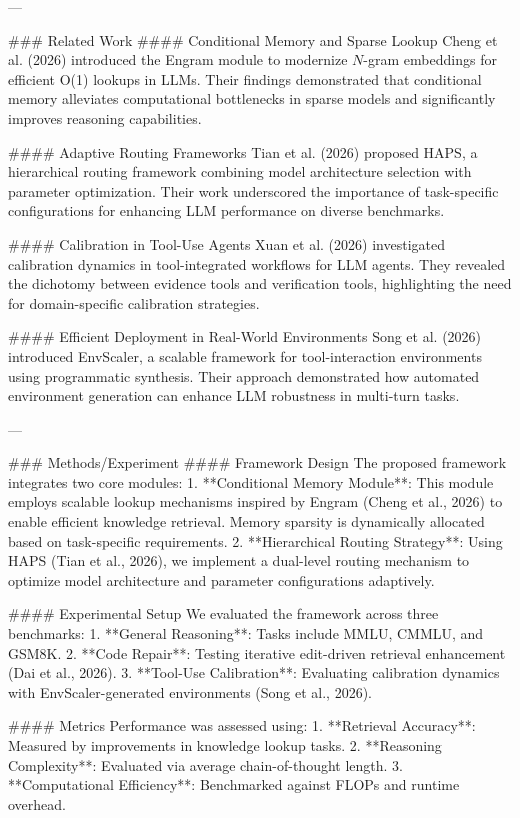---

### Related Work  
#### Conditional Memory and Sparse Lookup  
Cheng et al. (2026) introduced the Engram module to modernize $N$-gram embeddings for efficient O(1) lookups in LLMs. Their findings demonstrated that conditional memory alleviates computational bottlenecks in sparse models and significantly improves reasoning capabilities.

#### Adaptive Routing Frameworks  
Tian et al. (2026) proposed HAPS, a hierarchical routing framework combining model architecture selection with parameter optimization. Their work underscored the importance of task-specific configurations for enhancing LLM performance on diverse benchmarks.

#### Calibration in Tool-Use Agents  
Xuan et al. (2026) investigated calibration dynamics in tool-integrated workflows for LLM agents. They revealed the dichotomy between evidence tools and verification tools, highlighting the need for domain-specific calibration strategies.

#### Efficient Deployment in Real-World Environments  
Song et al. (2026) introduced EnvScaler, a scalable framework for tool-interaction environments using programmatic synthesis. Their approach demonstrated how automated environment generation can enhance LLM robustness in multi-turn tasks.

---

### Methods/Experiment  
#### Framework Design  
The proposed framework integrates two core modules:  
1. **Conditional Memory Module**: This module employs scalable lookup mechanisms inspired by Engram (Cheng et al., 2026) to enable efficient knowledge retrieval. Memory sparsity is dynamically allocated based on task-specific requirements.  
2. **Hierarchical Routing Strategy**: Using HAPS (Tian et al., 2026), we implement a dual-level routing mechanism to optimize model architecture and parameter configurations adaptively.  

#### Experimental Setup  
We evaluated the framework across three benchmarks:  
1. **General Reasoning**: Tasks include MMLU, CMMLU, and GSM8K.  
2. **Code Repair**: Testing iterative edit-driven retrieval enhancement (Dai et al., 2026).  
3. **Tool-Use Calibration**: Evaluating calibration dynamics with EnvScaler-generated environments (Song et al., 2026).  

#### Metrics  
Performance was assessed using:  
1. **Retrieval Accuracy**: Measured by improvements in knowledge lookup tasks.  
2. **Reasoning Complexity**: Evaluated via average chain-of-thought length.  
3. **Computational Efficiency**: Benchmarked against FLOPs and runtime overhead.

